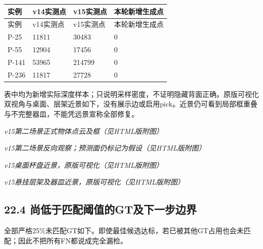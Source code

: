 \documentclass[UTF8,fontset=fandol]{ctexart}
\begin{document}
{\small
\begin{longtable}{|p{}|p{}|p{}|p{}|}
\hline
实例 & v14实测点 & v15实测点 & 本轮新增生成点 \\ \hline
\endfirsthead
\hline
实例 & v14实测点 & v15实测点 & 本轮新增生成点 \\ \hline
\endhead
P-25 & 11811 & 30483 & 0 \\ \hline
P-55 & 12904 & 17456 & 0 \\ \hline
P-141 & 53965 & 214799 & 0 \\ \hline
P-236 & 11817 & 27728 & 0 \\ \hline
\end{longtable}
}

表中均为新增实际深度样本；只说明采样密度，不证明隐藏背面正确。原版可视化双视角与桌面、层架近景如下，没有展示边或启用pick。近景仍可看到局部框重叠与不完整器皿，不能凭远景宣称全部修复。



\textit{v15第二场景正式物体点云及框（见HTML版附图）}



\textit{v15第二场景反向观察；预测面仍标记为假设（见HTML版附图）}



\textit{v15桌面杯盘近景，原版可视化（见HTML版附图）}



\textit{v15悬挂层架及器皿近景，原版可视化（见HTML版附图）}



\subsection*{22.4 尚低于匹配阈值的GT及下一步边界}

全部严格25\%未匹配GT如下。即使最佳候选达标，若已被其他GT占用也会未匹配；因此不把所有FN都说成完全漏检。
\end{document}
